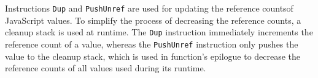 Instructions \texttt{Dup} and \texttt{PushUnref} are used for updating the reference counts\footnotemark[1] of JavaScript values. To simplify the process of decreasing the reference counts, a cleanup stack is used at runtime. The \texttt{Dup} instruction immediately increments the reference count of a value, whereas the \texttt{PushUnref} instruction only pushes the value to the cleanup stack, which is used in function's epilogue to decrease the reference counts of all values used during its runtime.



